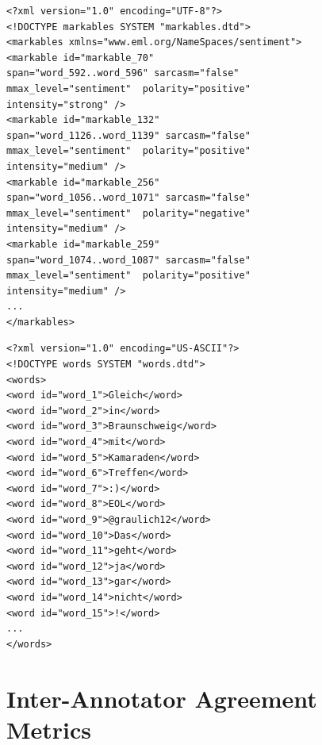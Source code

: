 \begin{minipage}[t]{\textwidth}
  \begin{minipage}[t]{0.45\textwidth}
    \lstset{language=XML}
    \begin{lstlisting}
<?xml version="1.0" encoding="UTF-8"?>
<!DOCTYPE markables SYSTEM "markables.dtd">
<markables xmlns="www.eml.org/NameSpaces/sentiment">
<markable id="markable_70"
span="word_592..word_596" sarcasm="false"
mmax_level="sentiment"  polarity="positive"
intensity="strong" />
<markable id="markable_132"
span="word_1126..word_1139" sarcasm="false"
mmax_level="sentiment"  polarity="positive"
intensity="medium" />
<markable id="markable_256"
span="word_1056..word_1071" sarcasm="false"
mmax_level="sentiment"  polarity="negative"
intensity="medium" />
<markable id="markable_259"
span="word_1074..word_1087" sarcasm="false"
mmax_level="sentiment"  polarity="positive"
intensity="medium" />
...
</markables>
    \end{lstlisting}%
  \end{minipage}\hfill%
  \begin{minipage}[t]{0.45\textwidth}%
    \lstset{language=XML}
    \begin{lstlisting}[basicstyle=\tiny]
<?xml version="1.0" encoding="US-ASCII"?>
<!DOCTYPE words SYSTEM "words.dtd">
<words>
<word id="word_1">Gleich</word>
<word id="word_2">in</word>
<word id="word_3">Braunschweig</word>
<word id="word_4">mit</word>
<word id="word_5">Kamaraden</word>
<word id="word_6">Treffen</word>
<word id="word_7">:)</word>
<word id="word_8">EOL</word>
<word id="word_9">@graulich12</word>
<word id="word_10">Das</word>
<word id="word_11">geht</word>
<word id="word_12">ja</word>
<word id="word_13">gar</word>
<word id="word_14">nicht</word>
<word id="word_15">!</word>
...
</words>
    \end{lstlisting}%
  \end{minipage}
\end{minipage}

\section{Inter-Annotator Agreement Metrics}\label{subsec:snt:iaa}

